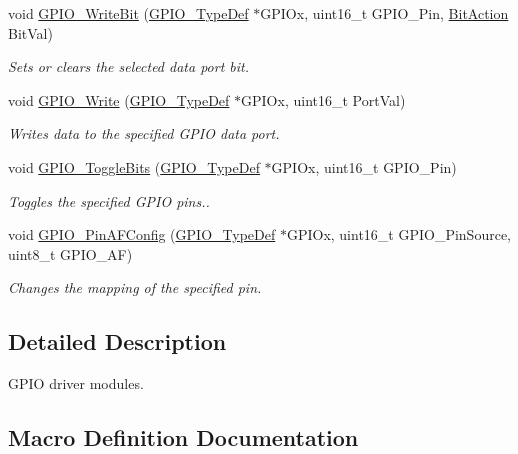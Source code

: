 \begin{DoxyCompactItemize}
void \hyperlink{group___g_p_i_o_ga8f7b237fd744d9f7456fbe0da47a9b80}{G\+P\+I\+O\+\_\+\+Write\+Bit} (\hyperlink{struct_g_p_i_o___type_def}{G\+P\+I\+O\+\_\+\+Type\+Def} $\ast$G\+P\+I\+Ox, uint16\+\_\+t G\+P\+I\+O\+\_\+\+Pin, \hyperlink{group___g_p_i_o_ga176130b21c0e719121470a6042d4cf19}{Bit\+Action} Bit\+Val)
\begin{DoxyCompactList}\small\item\em Sets or clears the selected data port bit. \end{DoxyCompactList}\item 
void \hyperlink{group___g_p_i_o_gaa925f19c8547a00c7a0c269a84873bf9}{G\+P\+I\+O\+\_\+\+Write} (\hyperlink{struct_g_p_i_o___type_def}{G\+P\+I\+O\+\_\+\+Type\+Def} $\ast$G\+P\+I\+Ox, uint16\+\_\+t Port\+Val)
\begin{DoxyCompactList}\small\item\em Writes data to the specified G\+P\+IO data port. \end{DoxyCompactList}\item 
void \hyperlink{group___g_p_i_o_gac1b837c66258872740d5f89f23549ab1}{G\+P\+I\+O\+\_\+\+Toggle\+Bits} (\hyperlink{struct_g_p_i_o___type_def}{G\+P\+I\+O\+\_\+\+Type\+Def} $\ast$G\+P\+I\+Ox, uint16\+\_\+t G\+P\+I\+O\+\_\+\+Pin)
\begin{DoxyCompactList}\small\item\em Toggles the specified G\+P\+IO pins.. \end{DoxyCompactList}\item 
void \hyperlink{group___g_p_i_o_ga0a77617a322562ae84f8d72486032c5d}{G\+P\+I\+O\+\_\+\+Pin\+A\+F\+Config} (\hyperlink{struct_g_p_i_o___type_def}{G\+P\+I\+O\+\_\+\+Type\+Def} $\ast$G\+P\+I\+Ox, uint16\+\_\+t G\+P\+I\+O\+\_\+\+Pin\+Source, uint8\+\_\+t G\+P\+I\+O\+\_\+\+AF)
\begin{DoxyCompactList}\small\item\em Changes the mapping of the specified pin. \end{DoxyCompactList}\end{DoxyCompactItemize}


\subsection{Detailed Description}
G\+P\+IO driver modules. 



\subsection{Macro Definition Documentation}
\mbox{\label{group___g_p_i_o_ga68b2a1f0b05c13978217db5439c7f790}} 
